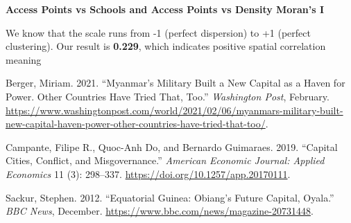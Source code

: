 \documentclass[
  letterpaper,
  DIV=11,
  numbers=noendperiod]{scrartcl}
\newlength{\cslhangindent}
\newenvironment{CSLReferences}[2] %
 {\begin{list}{}{%
  \setlength{\itemindent}{0pt}
  \setlength{\leftmargin}{0pt}
  \setlength{\parsep}{0pt}
  \ifodd #1
   \setlength{\leftmargin}{\cslhangindent}
   \setlength{\itemindent}{-1\cslhangindent}
  \fi
  \setlength{\itemsep}{#2\baselineskip}}}
 {\end{list}}
\begin{document}
\textbf{Access Points vs Schools and Access Points vs Density Moran's I}

We know that the scale runs from -1 (perfect dispersion) to +1 (perfect
clustering). Our result is \textbf{0.229}, which indicates positive
spatial correlation meaning

\label{refs}
\begin{CSLReferences}{1}{0}
Berger, Miriam. 2021. {``Myanmar's Military Built a New Capital as a
Haven for Power. {Other} Countries Have Tried That, Too.''}
\emph{Washington Post}, February.
\url{https://www.washingtonpost.com/world/2021/02/06/myanmars-military-built-new-capital-haven-power-other-countries-have-tried-that-too/}.

Campante, Filipe R., Quoc-Anh Do, and Bernardo Guimaraes. 2019.
{``Capital {Cities}, {Conflict}, and {Misgovernance}.''} \emph{American
Economic Journal: Applied Economics} 11 (3): 298--337.
\url{https://doi.org/10.1257/app.20170111}.

Sackur, Stephen. 2012. {``Equatorial {Guinea}: {Obiang}'s Future
Capital, {Oyala}.''} \emph{BBC News}, December.
\url{https://www.bbc.com/news/magazine-20731448}.

\end{CSLReferences}
\end{document}
